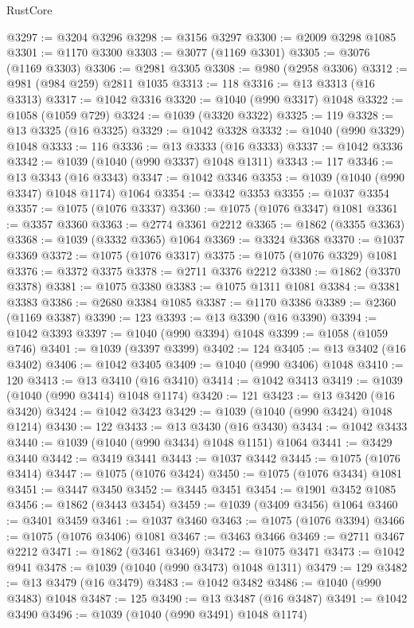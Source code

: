 \begin{lexlean}{RustCore}
\begin{coremodule}
@3297 := @3204 @3296
@3298 := @3156 @3297
@3300 := @2009 @3298 @1085
@3301 := @1170 @3300
@3303 := @3077 (@1169 @3301)
@3305 := @3076 (@1169 @3303)
@3306 := @2981 @3305
@3308 := @980 (@2958 @3306)
@3312 := @981 (@984 @259) @2811 @1035
@3313 := 118
@3316 := @13 @3313 (@16 @3313)
@3317 := @1042 @3316
@3320 := @1040 (@990 @3317) @1048
@3322 := @1058 (@1059 @729)
@3324 := @1039 (@3320 @3322)
@3325 := 119
@3328 := @13 @3325 (@16 @3325)
@3329 := @1042 @3328
@3332 := @1040 (@990 @3329) @1048
@3333 := 116
@3336 := @13 @3333 (@16 @3333)
@3337 := @1042 @3336
@3342 := @1039 (@1040 (@990 @3337) @1048 @1311)
@3343 := 117
@3346 := @13 @3343 (@16 @3343)
@3347 := @1042 @3346
@3353 := @1039 (@1040 (@990 @3347) @1048 @1174) @1064
@3354 := @3342 @3353
@3355 := @1037 @3354
@3357 := @1075 (@1076 @3337)
@3360 := @1075 (@1076 @3347) @1081
@3361 := @3357 @3360
@3363 := @2774 @3361 @2212
@3365 := @1862 (@3355 @3363)
@3368 := @1039 (@3332 @3365) @1064
@3369 := @3324 @3368
@3370 := @1037 @3369
@3372 := @1075 (@1076 @3317)
@3375 := @1075 (@1076 @3329) @1081
@3376 := @3372 @3375
@3378 := @2711 @3376 @2212
@3380 := @1862 (@3370 @3378)
@3381 := @1075 @3380
@3383 := @1075 @1311 @1081
@3384 := @3381 @3383
@3386 := @2680 @3384 @1085
@3387 := @1170 @3386
@3389 := @2360 (@1169 @3387)
@3390 := 123
@3393 := @13 @3390 (@16 @3390)
@3394 := @1042 @3393
@3397 := @1040 (@990 @3394) @1048
@3399 := @1058 (@1059 @746)
@3401 := @1039 (@3397 @3399)
@3402 := 124
@3405 := @13 @3402 (@16 @3402)
@3406 := @1042 @3405
@3409 := @1040 (@990 @3406) @1048
@3410 := 120
@3413 := @13 @3410 (@16 @3410)
@3414 := @1042 @3413
@3419 := @1039 (@1040 (@990 @3414) @1048 @1174)
@3420 := 121
@3423 := @13 @3420 (@16 @3420)
@3424 := @1042 @3423
@3429 := @1039 (@1040 (@990 @3424) @1048 @1214)
@3430 := 122
@3433 := @13 @3430 (@16 @3430)
@3434 := @1042 @3433
@3440 := @1039 (@1040 (@990 @3434) @1048 @1151) @1064
@3441 := @3429 @3440
@3442 := @3419 @3441
@3443 := @1037 @3442
@3445 := @1075 (@1076 @3414)
@3447 := @1075 (@1076 @3424)
@3450 := @1075 (@1076 @3434) @1081
@3451 := @3447 @3450
@3452 := @3445 @3451
@3454 := @1901 @3452 @1085
@3456 := @1862 (@3443 @3454)
@3459 := @1039 (@3409 @3456) @1064
@3460 := @3401 @3459
@3461 := @1037 @3460
@3463 := @1075 (@1076 @3394)
@3466 := @1075 (@1076 @3406) @1081
@3467 := @3463 @3466
@3469 := @2711 @3467 @2212
@3471 := @1862 (@3461 @3469)
@3472 := @1075 @3471
@3473 := @1042 @941
@3478 := @1039 (@1040 (@990 @3473) @1048 @1311)
@3479 := 129
@3482 := @13 @3479 (@16 @3479)
@3483 := @1042 @3482
@3486 := @1040 (@990 @3483) @1048
@3487 := 125
@3490 := @13 @3487 (@16 @3487)
@3491 := @1042 @3490
@3496 := @1039 (@1040 (@990 @3491) @1048 @1174)

\end{coremodule}
\end{lexlean}
